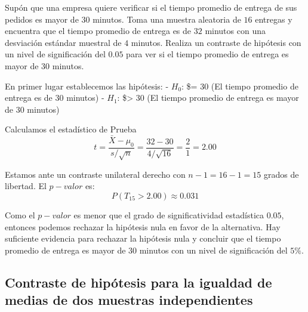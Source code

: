 \documentclass[
  letterpaper,
  DIV=11,
  numbers=noendperiod]{scrreprt}
\begin{document}
\begin{tcolorbox}[enhanced jigsaw, arc=.35mm, breakable, coltitle=black, left=2mm, opacityback=0, bottomtitle=1mm, colbacktitle=quarto-callout-tip-color!10!white, title=\textcolor{quarto-callout-tip-color}{\faLightbulb}\hspace{0.5em}{Ejemplo Práctico. Contraste de hipótesis media normal, varianza
desconocida}, titlerule=0mm, colback=white, colframe=quarto-callout-tip-color-frame, bottomrule=.15mm, rightrule=.15mm, opacitybacktitle=0.6, toptitle=1mm, toprule=.15mm, leftrule=.75mm]

Supón que una empresa quiere verificar si el tiempo promedio de entrega
de sus pedidos es mayor de \(30\) minutos. Toma una muestra aleatoria de
\(16\) entregas y encuentra que el tiempo promedio de entrega es de
\(32\) minutos con una desviación estándar muestral de \(4\) minutos.
Realiza un contraste de hipótesis con un nivel de significación del
\(0.05\) para ver si el tiempo promedio de entrega es mayor de \(30\)
minutos.

En primer lugar establecemos las hipótesis: - \(H_0\): \$\mu = 30 (El
tiempo promedio de entrega es de 30 minutos) - \(H_1\):
\$\mu \textgreater{} 30 (El tiempo promedio de entrega es mayor de 30
minutos)

Calculamos el estadístico de Prueba
\[ t = \frac{\bar{X} - \mu_0}{s/\sqrt{n}} = \frac{32 - 30}{4/\sqrt{16}} = \frac{2}{1} = 2.00 \]

Estamos ante un contraste unilateral derecho con \(n - 1 = 16 - 1 = 15\)
grados de libertad. El \(p-valor\) es:
\[P(T_{15} > 2.00) \approx 0.031\]

Como el \(p-valor\) es menor que el grado de significatividad
estadística \(0.05\), entonces podemos rechazar la hipótesis nula en
favor de la alternativa. Hay suficiente evidencia para rechazar la
hipótesis nula y concluir que el tiempo promedio de entrega es mayor de
\(30\) minutos con un nivel de significación del \(5\%\).

\end{tcolorbox}

\hypertarget{contraste-de-hipuxf3tesis-para-la-igualdad-de-medias-de-dos-muestras-independientes}{%
\subsection{Contraste de hipótesis para la igualdad de medias de dos
muestras
independientes}\label{contraste-de-hipuxf3tesis-para-la-igualdad-de-medias-de-dos-muestras-independientes}}
\end{document}
